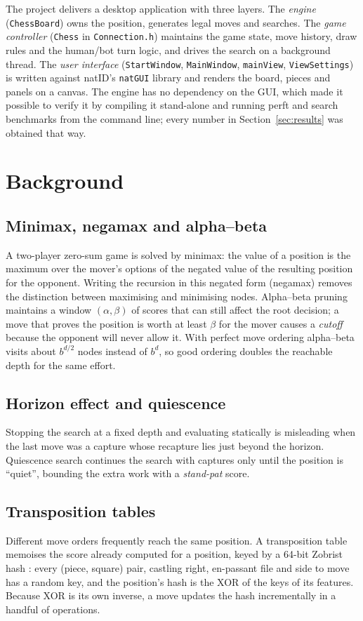 \documentclass[conference]{IEEEtran}
\begin{document}
The project delivers a desktop application with three layers. The \emph{engine} (\texttt{ChessBoard}) owns the position, generates legal moves and searches. The \emph{game controller} (\texttt{Chess} in \texttt{Connection.h}) maintains the game state, move history, draw rules and the human/bot turn logic, and drives the search on a background thread. The \emph{user interface} (\texttt{StartWindow}, \texttt{MainWindow}, \texttt{mainView}, \texttt{ViewSettings}) is written against natID's \texttt{natGUI} library and renders the board, pieces and panels on a canvas. The engine has no dependency on the GUI, which made it possible to verify it by compiling it stand-alone and running perft and search benchmarks from the command line; every number in Section~\ref{sec:results} was obtained that way.

\section{Background}
\subsection{Minimax, negamax and alpha--beta}
A two-player zero-sum game is solved by minimax: the value of a position is the maximum over the mover's options of the negated value of the resulting position for the opponent. Writing the recursion in this negated form (negamax) removes the distinction between maximising and minimising nodes. Alpha--beta pruning \cite{knuth} maintains a window $(\alpha,\beta)$ of scores that can still affect the root decision; a move that proves the position is worth at least $\beta$ for the mover causes a \emph{cutoff} because the opponent will never allow it. With perfect move ordering alpha--beta visits about $b^{d/2}$ nodes instead of $b^d$, so good ordering doubles the reachable depth for the same effort.

\subsection{Horizon effect and quiescence}
Stopping the search at a fixed depth and evaluating statically is misleading when the last move was a capture whose recapture lies just beyond the horizon. Quiescence search continues the search with captures only until the position is ``quiet'', bounding the extra work with a \emph{stand-pat} score.

\subsection{Transposition tables}
Different move orders frequently reach the same position. A transposition table memoises the score already computed for a position, keyed by a 64-bit Zobrist hash \cite{zobrist}: every (piece, square) pair, castling right, en-passant file and side to move has a random key, and the position's hash is the XOR of the keys of its features. Because XOR is its own inverse, a move updates the hash incrementally in a handful of operations.
\end{document}
